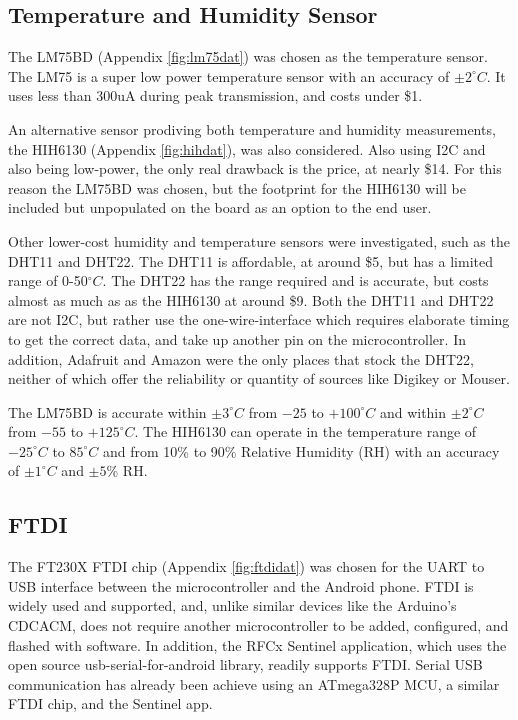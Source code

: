 \documentclass{article}
\numberwithin{figure}{section}
\numberwithin{equation}{section}
\begin{document}
{\subsection{Temperature and Humidity Sensor} \label{sect:temp_just}
The LM75BD (Appendix \ref{fig:lm75dat}) was chosen as the temperature sensor.  The LM75 is a super low power temperature sensor with an accuracy of $\pm2^{\circ}C$. It uses less than 300uA during peak transmission, and costs under \$1.

\bigskip
An alternative sensor prodiving both temperature and humidity measurements, the HIH6130 (Appendix \ref{fig:hihdat}), was also considered. Also using I2C and also being low-power, the only real drawback is the price, at nearly \$14. For this reason the LM75BD was chosen, but the footprint for the HIH6130 will be included but unpopulated on the board as an option to the end user.

\bigskip
Other lower-cost humidity and temperature sensors were investigated, such as the DHT11 and DHT22. The DHT11 is affordable, at around \$5, but has a limited range of 0-50$^{\circ}C$. The DHT22 has the range required and is accurate, but costs almost as much as as the HIH6130 at around \$9. Both the DHT11 and DHT22 are not I2C, but rather use the one-wire-interface which requires elaborate timing to get the correct data, and take up another pin on the microcontroller. In addition, Adafruit and Amazon were the only places that stock the DHT22, neither of which offer the reliability or quantity of sources like Digikey or Mouser.

\bigskip
The LM75BD is accurate within $\pm3^{\circ}C$ from $-25$ to $+100^{\circ}C$ and within $\pm2^{\circ}C$ from $-55$ to $+125^{\circ}C$. The HIH6130 can operate in the temperature range of $-25^{\circ}C$ to $85^{\circ}C$ and from 10\% to 90\% Relative Humidity (RH) with an accuracy of $\pm1^{\circ}C$ and $\pm5$\% RH.

\subsection{FTDI} \label{sect:ftdi_just}
The FT230X FTDI chip (Appendix \ref{fig:ftdidat}) was chosen for the UART to USB interface between the microcontroller and the Android phone. FTDI is widely used and supported, and, unlike similar devices like the Arduino's CDCACM, does not require another microcontroller to be added, configured, and flashed with software. In addition, the RFCx Sentinel application, which uses the open source usb-serial-for-android library, readily supports FTDI. Serial USB communication has already been achieve using an ATmega328P MCU, a similar FTDI chip, and the Sentinel app.

}
\end{document}
